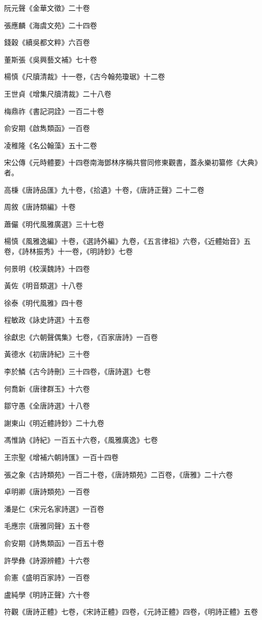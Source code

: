 阮元聲《金華文徵》二十卷

張應麟《海虞文苑》二十四卷

錢穀《續吳都文粹》六百卷

董斯張《吳興藝文補》七十卷

楊慎《尺牘清裁》十一卷，《古今翰苑瓊琚》十二卷

王世貞《增集尺牘清裁》二十八卷

梅鼎祚《書記洞詮》一百二十卷

俞安期《啟雋類函》一百卷

凌稚隆《名公翰藻》五十二卷

宋公傳《元時體要》十四卷南海鄧林序稱共嘗同修東觀書，蓋永樂初纂修《大典》者。

高棅《唐詩品匯》九十卷，《拾遺》十卷，《唐詩正聲》二十二卷

周敘《唐詩類編》十卷

蕭儼《明代風雅廣選》三十七卷

楊慎《風雅逸編》十卷，《選詩外編》九卷，《五言律祖》六卷，《近體始音》五卷，《詩林振秀》十一卷，《明詩鈔》七卷

何景明《校漢魏詩》十四卷

黃佐《明音類選》十八卷

徐泰《明代風雅》四十卷

程敏政《詠史詩選》十五卷

徐獻忠《六朝聲偶集》七卷，《百家唐詩》一百卷

黃德水《初唐詩紀》三十卷

李於鱗《古今詩刪》三十四卷，《唐詩選》七卷

何喬新《唐律群玉》十六卷

鄒守愚《全唐詩選》十八卷

謝東山《明近體詩鈔》二十九卷

馮惟訥《詩紀》一百五十六卷，《風雅廣逸》七卷

王宗聖《增補六朝詩匯》一百十四卷

張之象《古詩類苑》一百二十卷，《唐詩類苑》二百卷，《唐雅》二十六卷

卓明卿《唐詩類苑》一百卷

潘是仁《宋元名家詩選》一百卷

毛應宗《唐雅同聲》五十卷

俞安期《詩雋類函》一百五十卷

許學彝《詩源辨體》十六卷

俞憲《盛明百家詩》一百卷

盧純學《明詩正聲》六十卷

符觀《唐詩正體》七卷，《宋詩正體》四卷，《元詩正體》四卷，《明詩正體》五卷

